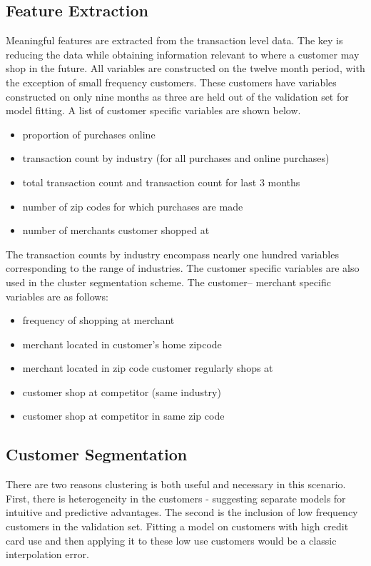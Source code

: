 \documentclass[12pt]{article} %
\begin{document}
\subsection{Feature Extraction}
Meaningful features are extracted from the transaction level data.  The key is reducing the data while obtaining information relevant to where a customer may shop in the future.  All variables are constructed on the twelve month period, with the exception of small frequency customers.  These customers have variables constructed on only nine months as three are held out of the validation set for model fitting.  A list of customer specific variables are shown below.
\small
\begin{itemize}
\item proportion of purchases online 
\item transaction count by industry (for all purchases and online purchases)
\item total transaction count and transaction count for last 3 months
\item number of zip codes for which purchases are made
\item number of merchants customer shopped at
\end{itemize}
\normalsize
The transaction counts by industry encompass nearly one hundred variables corresponding to the range of industries.  The customer specific variables are also used in the cluster segmentation scheme.   The customer-- merchant specific variables are as follows:
\small
\begin{itemize}
\item frequency of shopping at merchant
\item merchant located in customer's home zipcode
\item merchant located in zip code customer regularly shops at
\item customer shop at competitor (same industry)
\item customer shop at competitor in same zip code
\end{itemize}
\normalsize

\subsection{Customer Segmentation}
There are two reasons clustering is both useful and necessary in this scenario.  First, there is heterogeneity in the customers - suggesting separate models for intuitive and predictive advantages.  The second is the inclusion of low frequency customers in the validation set.  Fitting a model on customers with high credit card use and then applying it to these low use customers would be a classic interpolation error.
\end{document}
